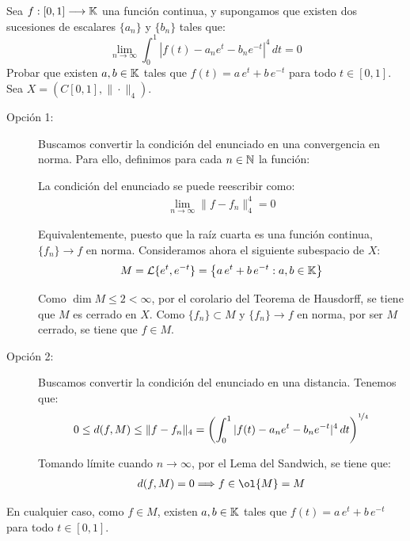\begin{ejercicio}
Sea $f: \left[0, 1\right] \longrightarrow \mathbb{K}$ una función continua, y supongamos que existen dos sucesiones de escalares $\{a_n\}$ y $\{b_n\}$ tales que:
\[
\lim\limits_{n \to \infty} \int_{0}^1 |f(t) - a_n e^t - b_n e^{-t}|^4\,dt = 0
\]
Probar que existen $a, b \in \mathbb{K}$ tales que $f(t) = a\,e^t + b\,e^{-t}$ para todo $t \in \left[0, 1\right]$.\\

Sea $X=\left(C[0, 1], \|\cdot\|_4\right)$. 

\begin{description}
    \item[Opción 1:] Buscamos convertir la condición del enunciado en una convergencia en norma. Para ello, definimos para cada $n\in \mathbb{N}$ la función:

    La condición del enunciado se puede reescribir como:
    \begin{align*}
        \lim\limits_{n \to \infty} \|f - f_n\|_4^4 = 0
    \end{align*}

    Equivalentemente, puesto que la raíz cuarta es una función continua, $\{f_n\}\to f$ en norma. Consideramos ahora el siguiente subespacio de $X$:
    \begin{equation*}
        M = \mathcal{L}\{e^t, e^{-t}\} = \left\{a\,e^t + b\,e^{-t} : a, b \in \mathbb{K}\right\}
    \end{equation*}

    Como $\dim M\leq 2<\infty$, por el corolario del Teorema de Hausdorff, se tiene que $M$ es cerrado en $X$. Como $\{f_n\}\subset M$ y $\{f_n\}\to f$ en norma, por ser $M$ cerrado, se tiene que $f \in M$.

    \item[Opción 2:] Buscamos convertir la condición del enunciado en una distancia. Tenemos que:
    \begin{equation*}
        0\leq d(f, M)\leq \|f - f_n\|_4 = \left(\int_{0}^1 |f(t) - a_n e^t - b_n e^{-t}|^4\,dt\right)^{\nicefrac{1}{4}}
    \end{equation*}

    Tomando límite cuando $n \to \infty$, por el Lema del Sandwich, se tiene que:
    \begin{align*}
        d(f, M) = 0 \Longrightarrow f \in \ol{M} = M
    \end{align*}
\end{description}


En cualquier caso, como $f\in M$, existen $a, b \in \mathbb{K}$ tales que $f(t) = a\,e^t + b\,e^{-t}$ para todo $t \in [0, 1]$.
\end{ejercicio}

